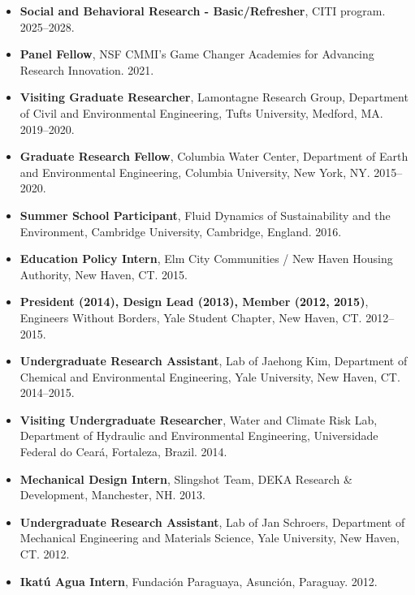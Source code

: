 \documentclass[10pt,oneside]{article}
\begin{document}
\begin{itemize}[label={}]

  \item \textbf{Social and Behavioral Research - Basic/Refresher}, CITI program. 2025--2028.

  \item \textbf{Panel Fellow}, NSF CMMI's Game Changer Academies for Advancing Research Innovation. 2021.

  \item \textbf{Visiting Graduate Researcher}, Lamontagne Research Group, Department of Civil and Environmental Engineering, Tufts University, Medford, MA. 2019--2020.

  \item \textbf{Graduate Research Fellow}, Columbia Water Center, Department of Earth and Environmental Engineering, Columbia University, New York, NY. 2015--2020.

  \item \textbf{Summer School Participant}, Fluid Dynamics of Sustainability and the Environment, Cambridge University, Cambridge, England. 2016.

  \item \textbf{Education Policy Intern}, Elm City Communities / New Haven Housing Authority, New Haven, CT. 2015.

  \item \textbf{President (2014), Design Lead (2013), Member (2012, 2015)}, Engineers Without Borders, Yale Student Chapter, New Haven, CT. 2012--2015.

  \item \textbf{Undergraduate Research Assistant}, Lab of Jaehong Kim, Department of Chemical and Environmental Engineering, Yale University, New Haven, CT. 2014--2015.

  \item \textbf{Visiting Undergraduate Researcher}, Water and Climate Risk Lab, Department of Hydraulic and Environmental Engineering, Universidade Federal do Ceará, Fortaleza, Brazil. 2014.

  \item \textbf{Mechanical Design Intern}, Slingshot Team, DEKA Research \& Development, Manchester, NH. 2013.

  \item \textbf{Undergraduate Research Assistant}, Lab of Jan Schroers, Department of Mechanical Engineering and Materials Science, Yale University, New Haven, CT. 2012.

  \item \textbf{Ikatú Agua Intern}, Fundación Paraguaya, Asunción, Paraguay. 2012.

\end{itemize}
\end{document}
